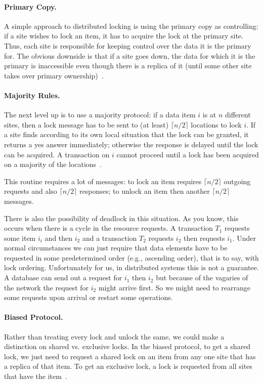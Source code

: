 \documentclass[a4paper]{report}
\begin{document}
\paragraph{Primary Copy.}A simple approach to distributed locking is using the primary copy as controlling: if a site wishes to lock an item, it has to acquire the lock at the primary site. Thus, each site is responsible for keeping control over the data it is the primary for. The obvious downside is that if a site goes down, the data for which it is the primary is inaccessible even though there is a replica of it (until some other site takes over primary ownership)~\cite{dsc}.

\paragraph{Majority Rules.} The next level up is to use a majority protocol: if a data item $i$ is at $n$ different sites, then a lock message has to be sent to (at least) $\lceil n/2 \rceil$ locations to lock $i$. If a site finds according to its own local situation that the lock can be granted, it returns a yes answer immediately; otherwise the response is delayed until the lock can be acquired. A transaction on $i$ cannot proceed until a lock has been acquired on a majority of the locations~\cite{dsc}.

This routine requires a lot of messages: to lock an item requires $\lceil n/2 \rceil$ outgoing requests and also  $\lceil n/2 \rceil$ responses; to unlock an item then another $\lceil n/2 \rceil$ messages.

There is also the possibility of deadlock in this situation. As you know, this occurs when there is a cycle in the resource requests. A transaction $T_{1}$ requests some item $i_{i}$ and then $i_{2}$ and a transaction $T_{2}$ requests $i_{2}$ then requests $i_{1}$. Under normal circumstances we can just require that data elements have to be requested in some predetermined order (e.g., ascending order), that is to say, with lock ordering. Unfortunately for us, in distributed systems this is not a guarantee. A database can send out a request for $i_{1}$ then $i_{2}$ but because of the vagaries of the network the request for $i_{2}$ might arrive first. So we might need to rearrange some requests upon arrival or restart some operations.

\paragraph{Biased Protocol.} Rather than treating every lock and unlock the same, we could make a distinction on shared vs. exclusive locks. In the biased protocol, to get a shared lock, we just need to request a shared lock on an item from any one site that has a replica of that item. To get an exclusive lock, a lock is requested from all sites that have the item~\cite{dsc}.
\end{document}
